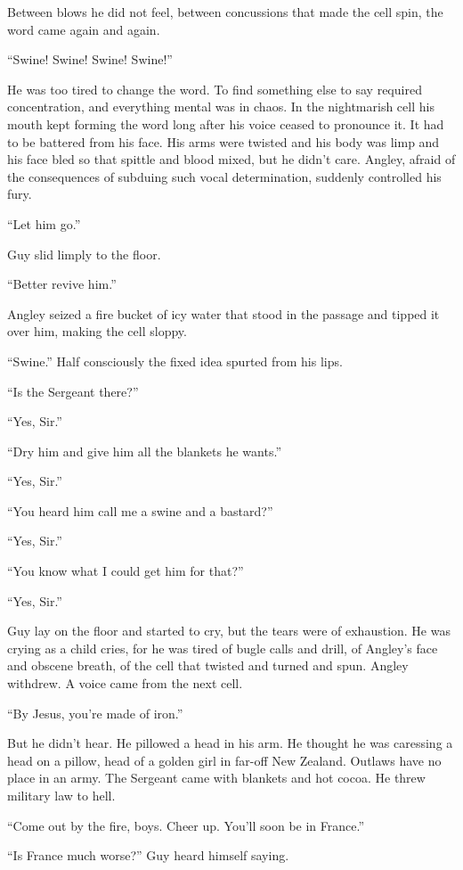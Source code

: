 Between blows he did not feel, between concussions that made the cell 
spin, the word came again and again.

``Swine! Swine! Swine! Swine!''

He was too tired to change the word. To find something else 
to say required concentration, and everything mental was in 
chaos. In the nightmarish cell his mouth kept forming the word 
long after his voice ceased to pronounce it. It had to be battered 
from his face. His arms were twisted and his body was limp and 
his face bled so that spittle and blood mixed, but he didn't care. 
Angley, afraid of the consequences of subduing such vocal 
determination, suddenly controlled his fury.

``Let him go.''

Guy slid limply to the floor.

``Better revive him.''

Angley seized a fire bucket of icy water that stood in the 
passage and tipped it over him, making the cell sloppy.

``Swine.'' Half consciously the fixed idea spurted from his lips.

``Is the Sergeant there?''

``Yes, Sir.''

``Dry him and give him all the blankets he wants.''

``Yes, Sir.''

``You heard him call me a swine and a bastard?''

``Yes, Sir.''

``You know what I could get him for that?''

``Yes, Sir.''

Guy lay on the floor and started to cry, but the tears were of 
exhaustion. He was crying as a child cries, for he was tired of 
bugle calls and drill, of Angley's face and obscene breath, of 
the cell that twisted and turned and spun. Angley withdrew. A 
voice came from the next cell.

``By Jesus, you're made of iron.''

But he didn't hear. He pillowed a head in his arm. He 
thought he was caressing a head on a pillow, head of a 
golden girl in far-off New Zealand. Outlaws have no place 
in an army. The Sergeant came with blankets and hot cocoa. 
He threw military law to hell.

``Come out by the fire, boys. Cheer up. You'll soon be 
in France.''

``Is France much worse?'' Guy heard himself saying.

